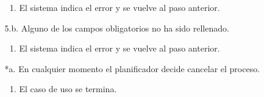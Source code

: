 \begin{itemize}
\begin{itemize}
		\begin{enumerate}
		\item El sistema indica el error y se vuelve al paso anterior.
		\end{enumerate}
	\item[5.b.] Alguno de los campos obligatorios no ha sido rellenado.
		\begin{enumerate}
		\item El sistema indica el error y se vuelve al paso anterior.
		\end{enumerate}	
	\item[*a.] En cualquier momento el planificador decide cancelar el proceso.
		\begin{enumerate}
		\item El caso de uso se termina.
		\end{enumerate}
	\end{itemize}
\end{itemize}



